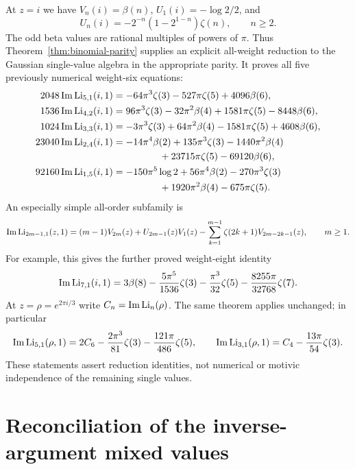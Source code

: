 At $z=i$ we have $V_n(i)=\beta(n)$,
$U_1(i)=-\log2/2$, and
\[
 U_n(i)=-2^{-n}(1-2^{1-n})\zeta(n),\qquad n\ge2.
\]
The odd beta values are rational multiples of powers of $\pi$.
Thus Theorem~\ref{thm:binomial-parity} supplies an explicit all-weight
reduction to the Gaussian single-value algebra in the appropriate parity.
It proves all five previously numerical weight-six equations:
\begin{align*}
2048\operatorname{Im}\Li_{5,1}(i,1)
 &=-64\pi^3\zeta(3)-527\pi\zeta(5)+4096\beta(6),\\
1536\operatorname{Im}\Li_{4,2}(i,1)
 &=96\pi^3\zeta(3)-32\pi^2\beta(4)+1581\pi\zeta(5)-8448\beta(6),\\
1024\operatorname{Im}\Li_{3,3}(i,1)
 &=-3\pi^3\zeta(3)+64\pi^2\beta(4)-1581\pi\zeta(5)+4608\beta(6),\\
23040\operatorname{Im}\Li_{2,4}(i,1)
 &=-14\pi^4\beta(2)+135\pi^3\zeta(3)-1440\pi^2\beta(4)\\
 &\hspace{17mm}+23715\pi\zeta(5)-69120\beta(6),\\
92160\operatorname{Im}\Li_{1,5}(i,1)
 &=-150\pi^5\log2+56\pi^4\beta(2)-270\pi^3\zeta(3)\\
 &\hspace{17mm}+1920\pi^2\beta(4)-675\pi\zeta(5).
\end{align*}
An especially simple all-order subfamily is
\begin{equation}\label{eq:leading-index-family}
 \operatorname{Im}\operatorname{Li}_{2m-1,1}(z,1)
  =(m-1)V_{2m}(z)+U_{2m-1}(z)V_1(z)
   -\sum_{k=1}^{m-1}\zeta(2k+1)V_{2m-2k-1}(z),
 \qquad m\ge1.
\end{equation}
For example, this gives the further proved weight-eight identity
\[
 \operatorname{Im}\operatorname{Li}_{7,1}(i,1)
 =3\beta(8)-\frac{5\pi^5}{1536}\zeta(3)
             -\frac{\pi^3}{32}\zeta(5)
             -\frac{8255\pi}{32768}\zeta(7).
\]
At $z=\rho=e^{2\pi i/3}$ write $C_n=\operatorname{Im}\operatorname{Li}_n(\rho)$.
The same theorem applies unchanged; in particular
\[
 \operatorname{Im}\operatorname{Li}_{5,1}(\rho,1)
 =2C_6-\frac{2\pi^3}{81}\zeta(3)-\frac{121\pi}{486}\zeta(5),
\qquad
 \operatorname{Im}\operatorname{Li}_{3,1}(\rho,1)
 =C_4-\frac{13\pi}{54}\zeta(3).
\]
These statements assert reduction identities, not numerical or motivic
independence of the remaining single values.

\section{Reconciliation of the inverse-argument mixed values}
\label{sec:mixed-reconciliation}

